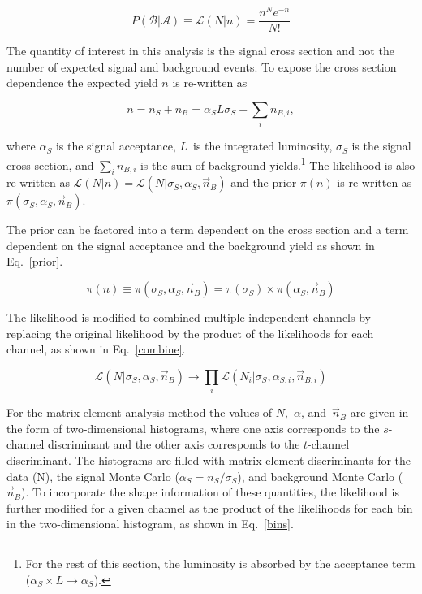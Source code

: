 \begin{equation}
\label{poisson}
P(\mathcal{B}|\mathcal{A}) \equiv \mathcal{L}(N|n) = \frac{n^{N}e^{-n}}{N!}
\end{equation}

The quantity of interest in this analysis is the signal cross section and not the number of expected signal and background events. To expose the cross section dependence the expected yield $n$ is re-written as

\begin{equation}
\label{expected}
n = n_{S} + n_{B} = \alpha_{S} L \sigma_{S} + \sum_{i} n_{B,i},
\end{equation}

\noindent where $\alpha_{S}$ is the signal acceptance, $L$~is the integrated luminosity, $\sigma_{S}$ is the signal cross section, and $\sum_{i} n_{B,i}$ is the sum of background yields.\footnote{For the rest of this section, the luminosity is absorbed by the acceptance term ($\alpha_{S} \times L \rightarrow \alpha_{S}$).} The likelihood is also re-written as $\mathcal{L}(N|n) = \mathcal{L}(N|\sigma_{S},\alpha_{S},\vec{n}_{B})$ and the prior $\pi(n)$ is re-written as $\pi(\sigma_{S},\alpha_{S}, \vec{n}_{B})$. 

The prior can be factored into a term dependent on the cross section and a term dependent on the signal acceptance and the background yield as shown in Eq.~\ref{prior}. 

\begin{equation}
\label{prior}
\pi(n) \equiv \pi(\sigma_{S},\alpha_{S}, \vec{n}_{B}) = \pi(\sigma_{S}) \times \pi(\alpha_{S}, \vec{n}_{B})
\end{equation}

The likelihood is modified to combined multiple independent channels by replacing the original likelihood by the product of the likelihoods for each channel, as shown in Eq.~\ref{combine}.

\begin{equation}
\label{combine}
\mathcal{L}(N|\sigma_{S},\alpha_{S}, \vec{n}_{B}) \rightarrow \prod_{i} \mathcal{L}(N_{i}|\sigma_{S},\alpha_{S,i}, \vec{n}_{B,i})
\end{equation}

For the matrix element analysis method the values of $N$,~$\alpha$, and~$\vec{n}_{B}$ are given in the form of two-dimensional histograms, where one axis corresponds to the $s$-channel discriminant and the other axis corresponds to the $t$-channel discriminant. The histograms are filled with matrix element discriminants for the data (N), the signal Monte Carlo ($\alpha_{S}=n_{S}/\sigma_{S}$), and background Monte Carlo ($\vec{n}_{B}$). To incorporate the shape information of these quantities, the likelihood is further modified for a given channel as the product of the likelihoods for each bin in the two-dimensional histogram, as shown in Eq.~\ref{bins}.

